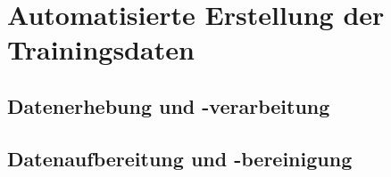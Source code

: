 \section{Automatisierte Erstellung der Trainingsdaten}

\subsection{Datenerhebung und -verarbeitung}

\subsection{Datenaufbereitung und -bereinigung}